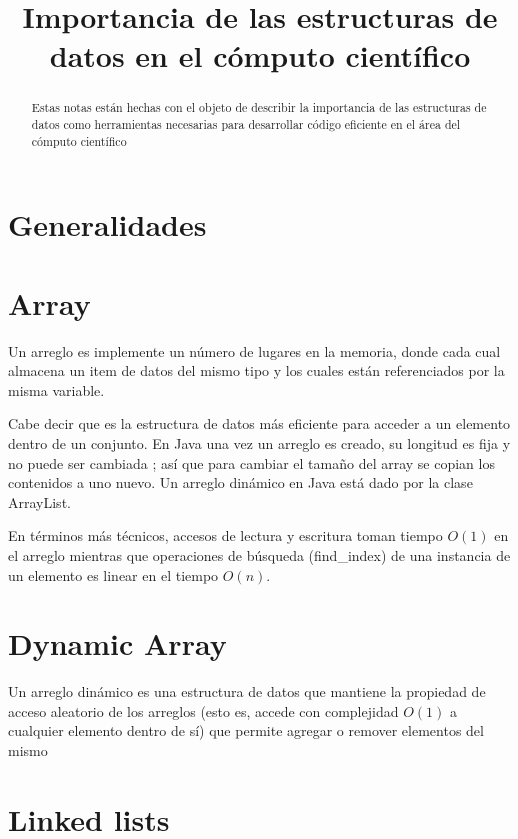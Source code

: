\documentclass[11pt,letterpaper]{article}
\begin{document}
\title{Importancia de las estructuras de datos en el cómputo científico}
\maketitle

\begin{abstract}
Estas notas están hechas con el objeto de describir la importancia de las estructuras de datos como herramientas necesarias para desarrollar código eficiente en el área del cómputo científico
\end{abstract}

\section{Generalidades}

\section{Array}

Un arreglo es implemente un número de lugares en la memoria, donde cada cual almacena un item de datos del mismo tipo y los cuales están referenciados por la misma variable.

Cabe decir que es la estructura de datos más eficiente para acceder a un elemento dentro de un conjunto. En Java una vez un arreglo es creado, su longitud es fija y no puede ser cambiada ; así que para cambiar el tamaño del array se copian los contenidos a uno nuevo. Un arreglo dinámico en Java está dado por la clase ArrayList. 

En términos más técnicos, accesos de lectura y escritura toman tiempo $O(1)$ en el arreglo mientras que operaciones de búsqueda (find_index) de una instancia de un elemento es linear en el tiempo $O(n)$.

\section{Dynamic Array}

Un arreglo dinámico es una estructura de datos que mantiene la propiedad de acceso aleatorio de los arreglos (esto es, accede con complejidad $O(1)$ a cualquier elemento dentro de sí) que permite agregar o remover elementos del mismo


\section{Linked lists}
\end{document}
